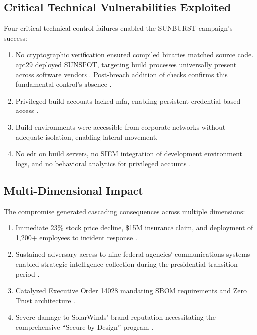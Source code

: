 \subsection{Critical Technical Vulnerabilities Exploited}
Four critical technical control failures enabled the SUNBURST campaign's success:

\begin{enumerate}
    \item {} No cryptographic verification ensured compiled binaries matched source code. \gls{apt}29 deployed SUNSPOT, targeting build processes universally present across software vendors \cite{openhearing2021}. Post-breach addition of checks confirms this fundamental control's absence \cite{nagle2023}.
    \item {} Privileged build accounts lacked \gls{mfa}, enabling persistent credential-based access \cite{nagle2023}.
    \item {} Build environments were accessible from corporate networks without adequate isolation, enabling lateral movement.
    \item {} No \gls{edr} on build servers, no SIEM integration of development environment logs, and no behavioral analytics for privileged accounts \cite{nagle2023}.
\end{enumerate}

\subsection{Multi-Dimensional Impact}
The compromise generated cascading consequences across multiple dimensions:

\begin{enumerate}
    \item {} Immediate 23\% stock price decline, \$15M insurance claim, and deployment of 1,200+ employees to incident response \cite{nagle2023}.
    \item {} Sustained adversary access to nine federal agencies' communications systems enabled strategic intelligence collection during the presidential transition period \cite{nagle2023, openhearing2021}.
    \item {} Catalyzed Executive Order 14028 mandating SBOM requirements and Zero Trust architecture \cite{biden2021}.
    \item {} Severe damage to SolarWinds' brand reputation necessitating the comprehensive ``Secure by Design'' program \cite{nagle2023}.
\end{enumerate}
